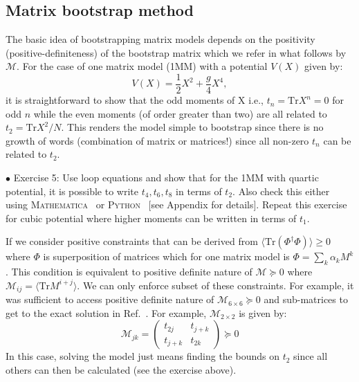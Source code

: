 \documentclass[11pt]{article}
\newcommand{\MA}{\textsc{Mathematica}}
\newcommand{\PY}{\textsc{Python}}
\begin{document}
\subsection{Matrix bootstrap method}

The basic idea of bootstrapping matrix models depends on the 
positivity (positive-definiteness) of the bootstrap matrix which we refer in what follows 
by $\mathcal{M}$. For the case of one matrix model (1MM) with a potential $V(X)$ given by: 
\begin{equation}
    V(X) = \frac12 X^2 + \frac{g}{4} X^4, 
\end{equation}
it is straightforward to show that the odd moments of X i.e., $ t_{n} = \mbox{Tr} X^n = 0$ for odd $n$
while the even moments (of order greater than two) are all related to $t_{2} = \mbox{Tr} X^2/N$. This renders the 
model simple to bootstrap since there is no growth of words (combination of matrix or matrices!)
since all non-zero $t_{n}$ can be related to $t_{2}$. 
\begin{mdframed}[backgroundcolor=blue!3] 
	\textsc{} 
	$\bullet$ Exercise 5: Use loop equations and show that for the 1MM with quartic potential, it is possible to write $t_{4}, t_{6}, t_{8}$ in terms of $t_{2}$. Also check this either using \MA~ or \PY~ [see Appendix for details]. 
Repeat this exercise for cubic potential where higher moments can be written in terms of $t_1$.  
\end{mdframed} 
If we consider positive constraints that can be derived from $\langle \mbox{Tr}(\Phi^{\dagger}\Phi) \rangle \ge 0 $
where $\Phi$ is superposition of matrices which for one matrix model is 
$ \Phi = \sum_{k} \alpha_{k} M^{k}$. This condition is equivalent to positive definite nature of
$\mathcal{M} \succeq 0 $ where $ \mathcal{M}_{ij} = \langle \mbox{Tr} M^{i+j} \rangle$. 
We can only enforce subset of these constraints. For example, it was sufficient to 
access positive definite nature of $\mathcal{M}_{6 \times 6} \succeq 0 $ 
and sub-matrices to get to the exact solution in Ref.~\cite{Lin:2020mme}. 
For example, $\mathcal{M}_{2 \times 2}$ is given by:
\begin{equation}
	\mathcal{M}_{jk} = 
	\begin{pmatrix}
		t_{2j} & t_{j+k}  \\
		t_{j+k} & t_{2k}  
	\end{pmatrix}  \succeq 0
\end{equation}
In this case, solving the model just means finding the bounds on $t_{2}$ 
since all others can then be calculated (see the exercise above). 
\end{document}
